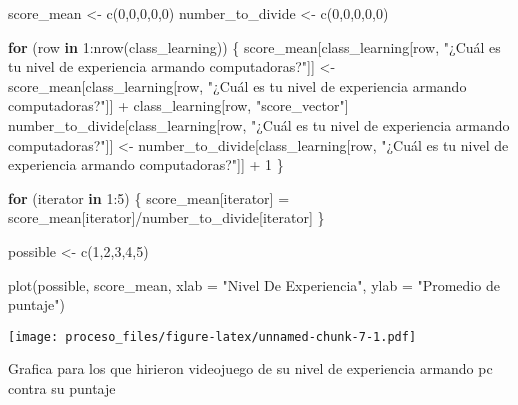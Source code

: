\documentclass[
]{article}
\newenvironment{Shaded}{\begin{snugshade}}{\end{snugshade}}
\newcommand{\AttributeTok}[1]{\textcolor[rgb]{0.77,0.63,0.00}{#1}}
\newcommand{\ControlFlowTok}[1]{\textcolor[rgb]{0.13,0.29,0.53}{\textbf{#1}}}
\newcommand{\DecValTok}[1]{\textcolor[rgb]{0.00,0.00,0.81}{#1}}
\newcommand{\FunctionTok}[1]{\textcolor[rgb]{0.00,0.00,0.00}{#1}}
\newcommand{\NormalTok}[1]{#1}
\newcommand{\OtherTok}[1]{\textcolor[rgb]{0.56,0.35,0.01}{#1}}
\newcommand{\SpecialCharTok}[1]{\textcolor[rgb]{0.00,0.00,0.00}{#1}}
\newcommand{\StringTok}[1]{\textcolor[rgb]{0.31,0.60,0.02}{#1}}
\begin{document}
\begin{Shaded}
\begin{Highlighting}[]
\NormalTok{score\_mean }\OtherTok{\textless{}{-}} \FunctionTok{c}\NormalTok{(}\DecValTok{0}\NormalTok{,}\DecValTok{0}\NormalTok{,}\DecValTok{0}\NormalTok{,}\DecValTok{0}\NormalTok{,}\DecValTok{0}\NormalTok{)}
\NormalTok{number\_to\_divide }\OtherTok{\textless{}{-}} \FunctionTok{c}\NormalTok{(}\DecValTok{0}\NormalTok{,}\DecValTok{0}\NormalTok{,}\DecValTok{0}\NormalTok{,}\DecValTok{0}\NormalTok{,}\DecValTok{0}\NormalTok{)}

\ControlFlowTok{for}\NormalTok{ (row }\ControlFlowTok{in} \DecValTok{1}\SpecialCharTok{:}\FunctionTok{nrow}\NormalTok{(class\_learning))}
\NormalTok{\{}
\NormalTok{  score\_mean[class\_learning[row, }\StringTok{"¿Cuál es tu nivel de experiencia armando computadoras?"}\NormalTok{]] }\OtherTok{\textless{}{-}}\NormalTok{ score\_mean[class\_learning[row, }\StringTok{"¿Cuál es tu nivel de experiencia armando computadoras?"}\NormalTok{]] }\SpecialCharTok{+}\NormalTok{ class\_learning[row, }\StringTok{"score\_vector"}\NormalTok{]}
\NormalTok{  number\_to\_divide[class\_learning[row, }\StringTok{"¿Cuál es tu nivel de experiencia armando computadoras?"}\NormalTok{]] }\OtherTok{\textless{}{-}}\NormalTok{ number\_to\_divide[class\_learning[row, }\StringTok{"¿Cuál es tu nivel de experiencia armando computadoras?"}\NormalTok{]] }\SpecialCharTok{+} \DecValTok{1}
\NormalTok{\}}

\ControlFlowTok{for}\NormalTok{ (iterator }\ControlFlowTok{in} \DecValTok{1}\SpecialCharTok{:}\DecValTok{5}\NormalTok{)}
\NormalTok{\{}
\NormalTok{  score\_mean[iterator] }\OtherTok{=}\NormalTok{ score\_mean[iterator]}\SpecialCharTok{/}\NormalTok{number\_to\_divide[iterator]}
\NormalTok{\}}


\NormalTok{possible }\OtherTok{\textless{}{-}} \FunctionTok{c}\NormalTok{(}\DecValTok{1}\NormalTok{,}\DecValTok{2}\NormalTok{,}\DecValTok{3}\NormalTok{,}\DecValTok{4}\NormalTok{,}\DecValTok{5}\NormalTok{)}

\FunctionTok{plot}\NormalTok{(possible, score\_mean, }\AttributeTok{xlab =} \StringTok{"Nivel De Experiencia"}\NormalTok{, }\AttributeTok{ylab =} \StringTok{"Promedio de puntaje"}\NormalTok{)}
\end{Highlighting}
\end{Shaded}

\texttt{[image: proceso\_files/figure-latex/unnamed-chunk-7-1.pdf]}

Grafica para los que hirieron videojuego de su nivel de experiencia
armando pc contra su puntaje
\end{document}
